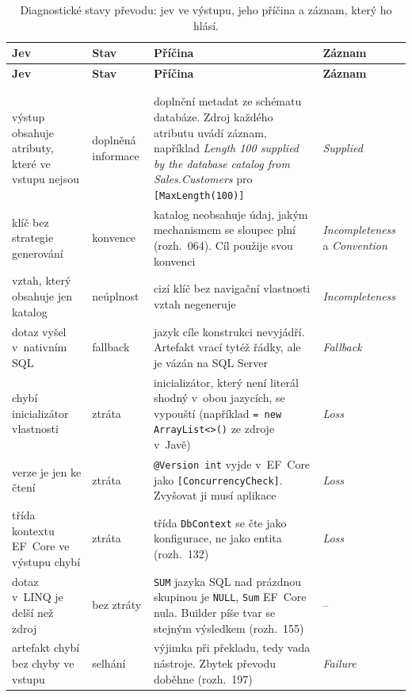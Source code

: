 {\footnotesize
\begin{longtable}{P{0.27} P{0.10} P{0.50} P{0.13}}
\toprule
\textbf{Jev} & \textbf{Stav} & \textbf{Příčina} & \textbf{Záznam} \\
\midrule
\endfirsthead
\toprule
\textbf{Jev} & \textbf{Stav} & \textbf{Příčina} & \textbf{Záznam} \\
\midrule
\endhead
\rule{0pt}{26pt}\\
\endfoot
\bottomrule
\caption{Diagnostické stavy převodu: jev ve výstupu, jeho příčina a záznam, který ho hlásí.}\label{tab:chyby-vypocet}\\
\endlastfoot
výstup obsahuje atributy, které ve vstupu nejsou & doplněná informace & doplnění metadat ze schématu databáze. Zdroj každého atributu uvádí záznam, například \emph{Length 100 supplied by the database catalog from \textquotesingle{}Sales.Customers\textquotesingle{}} pro \texttt{[MaxLength(100)]} & \emph{Supplied} \\
klíč bez strategie generování & konvence & katalog neobsahuje údaj, jakým mechanismem se sloupec plní (rozh.~064). Cíl použije svou konvenci & \emph{Incompleteness} a \emph{Convention} \\
vztah, který obsahuje jen katalog & neúplnost & cizí klíč bez navigační vlastnosti vztah negeneruje & \emph{Incompleteness} \\
dotaz vyšel v~nativním SQL & fallback & jazyk cíle konstrukci nevyjádří. Artefakt vrací tytéž řádky, ale je vázán na SQL Server & \emph{Fallback} \\
chybí inicializátor vlastnosti & ztráta & inicializátor, který není literál shodný v~obou jazycích, se vypouští (například \texttt{= new ArrayList<>()} ze zdroje v~Javě) & \emph{Loss} \\
verze je jen ke čtení & ztráta & \texttt{@Version int} vyjde v~EF~Core jako \texttt{[ConcurrencyCheck]}. Zvyšovat ji musí aplikace & \emph{Loss} \\
třída kontextu EF~Core ve výstupu chybí & ztráta & třída \texttt{DbContext} se čte jako konfigurace, ne jako entita (rozh.~132) & \emph{Loss} \\
dotaz v~LINQ je delší než zdroj & bez ztráty & \texttt{SUM} jazyka SQL nad prázdnou skupinou je \texttt{NULL}, \texttt{Sum} EF~Core nula. Builder píše tvar se stejným výsledkem (rozh.~155) & -- \\
artefakt chybí bez chyby ve vstupu & selhání & výjimka při překladu, tedy vada nástroje. Zbytek převodu doběhne (rozh.~197) & \emph{Failure} \\
\end{longtable}}

